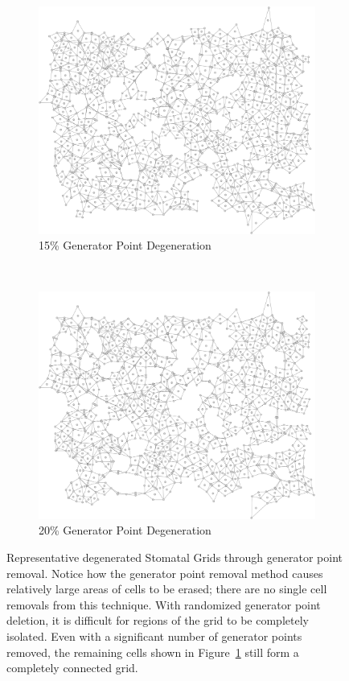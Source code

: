 \documentclass[a4paper,11pt]{report}
\begin{document}
\begin{figure}[htp]
\begin{subfigure}[t]{0.4\textwidth}
  \centering
  \includegraphics[width=\textwidth]{ch6_figs/degen_stoma_15_grid}
  \caption{15\% Generator Point Degeneration}
  \end{subfigure}
~
\begin{subfigure}[t]{0.4\textwidth}
  \centering
  \includegraphics[width=\textwidth]{ch6_figs/degen_stoma_20_grid}
  \caption{20\% Generator Point Degeneration}
  \label{fig:stoma_gen_pt_20}
  \end{subfigure}

\caption[Stomatal Generator Point Degeneration]{
  Representative degenerated Stomatal Grids through generator point removal. Notice how the generator point removal method causes relatively large areas of cells to be erased; there are no single cell removals from this technique. With randomized generator point deletion, it is difficult for regions of the grid to be completely isolated. Even with a significant number of generator points removed, the remaining cells shown in Figure~\ref{fig:stoma_gen_pt_20} still form a completely connected grid.
}
\label{fig:stoma_gen_pt_degen}
\end{figure}
\end{document}
